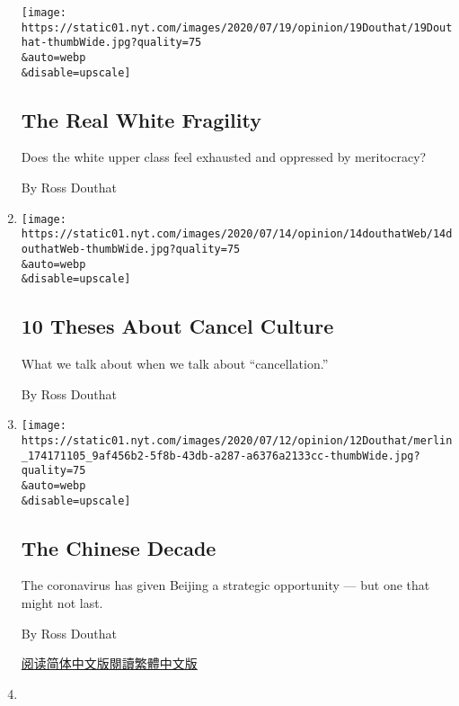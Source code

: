 \begin{enumerate}
  \texttt{[image: https://static01.nyt.com/images/2020/07/19/opinion/19Douthat/19Douthat-thumbWide.jpg?quality=75\\\&auto=webp\\\&disable=upscale]}

  \hypertarget{the-real-white-fragility}{%
  \subsection{The Real White Fragility}\label{the-real-white-fragility}}

  Does the white upper class feel exhausted and oppressed by
  meritocracy?

  By Ross Douthat
\item
  \href{/2020/07/14/opinion/cancel-culture-.html}{}

  \texttt{[image: https://static01.nyt.com/images/2020/07/14/opinion/14douthatWeb/14douthatWeb-thumbWide.jpg?quality=75\\\&auto=webp\\\&disable=upscale]}

  \hypertarget{10-theses-about-cancel-culture}{%
  \subsection{10 Theses About Cancel
  Culture}\label{10-theses-about-cancel-culture}}

  What we talk about when we talk about ``cancellation.''

  By Ross Douthat
\item
  \href{/2020/07/11/opinion/sunday/china-coronavirus-power.html}{}

  \texttt{[image: https://static01.nyt.com/images/2020/07/12/opinion/12Douthat/merlin\_174171105\_9af456b2-5f8b-43db-a287-a6376a2133cc-thumbWide.jpg?quality=75\\\&auto=webp\\\&disable=upscale]}

  \hypertarget{the-chinese-decade}{%
  \subsection{The Chinese Decade}\label{the-chinese-decade}}

  The coronavirus has given Beijing a strategic opportunity --- but one
  that might not last.

  By Ross Douthat

  \href{https://cn.nytimes.com/opinion/20200713/china-coronavirus-power/}{阅读简体中文版}\href{https://cn.nytimes.com/opinion/20200713/china-coronavirus-power/zh-hant/}{閱讀繁體中文版}
\item
  \href{/2020/07/07/opinion/protestant-progressive-reformation.html}{}


\end{enumerate}
